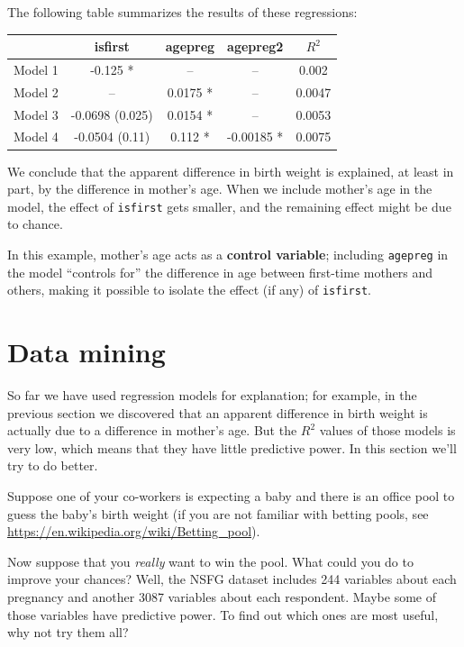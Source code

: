 \documentclass[12pt]{book}
\begin{document}
The following table summarizes the results of these regressions:

\begin{center}
\begin{tabular}{|l|c|c|c|c|}
\hline & isfirst & agepreg & agepreg2 & $R^2$ \\ \hline
Model 1 & -0.125 * & -- & -- & 0.002 \\
Model 2 & -- & 0.0175 * & -- & 0.0047 \\
Model 3 & -0.0698 (0.025) & 0.0154 * & -- & 0.0053 \\
Model 4 & -0.0504 (0.11) & 0.112 * & -0.00185 * & 0.0075 \\
\hline
\end{tabular}
\end{center}

We conclude that the apparent difference in birth weight
is explained, at least in part, by the difference in mother's age.
When we include mother's age in the model, the effect of
{\tt isfirst} gets smaller, and the remaining effect might be
due to chance.

In this example, mother's age acts as a {\bf control variable};
including {\tt agepreg} in the model ``controls for'' the
difference in age between first-time mothers and others, making
it possible to isolate the effect (if any) of {\tt isfirst}. 


\section{Data mining}
\label{mining}

So far we have used regression models for explanation; for example,
in the previous section we discovered that an apparent difference
in birth weight is actually due to a difference in mother's age.
But the $R^2$ values of those models is very low, which means that
they have little predictive power.  In this section we'll try to
do better.

Suppose one of your co-workers is expecting a baby and
there is an office pool to guess the baby's birth weight (if you are
not familiar with betting pools, see
\url{https://en.wikipedia.org/wiki/Betting_pool}).

Now suppose that you {\em really} want to win the pool.  What could
you do to improve your chances?  Well, 
the NSFG dataset includes 244 variables about each pregnancy and another
3087 variables about each respondent.  Maybe some of those variables
have predictive power.  To find out which ones are most useful,
why not try them all?
\end{document}
